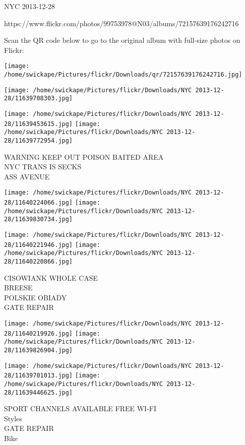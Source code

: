 \documentclass[10pt,letterpaper]{article}
\begin{document}
NYC 2013-12-28

https://www.flickr.com/photos/99753978@N03/albums/72157639176242716

Scan the QR code below to go to the original album with full-size photos on Flickr:

\texttt{[image: /home/swickape/Pictures/flickr/Downloads/qr/72157639176242716.jpg]}
\pagebreak

\texttt{[image: /home/swickape/Pictures/flickr/Downloads/NYC 2013-12-28/11639708303.jpg]}

\vspace{0.25in}
\texttt{[image: /home/swickape/Pictures/flickr/Downloads/NYC 2013-12-28/11639453615.jpg]}
\texttt{[image: /home/swickape/Pictures/flickr/Downloads/NYC 2013-12-28/11639772954.jpg]}

WARNING KEEP OUT POISON BAITED AREA\\
NYC TRANS IS SECKS\\
ASS AVENUE\\
\pagebreak

\texttt{[image: /home/swickape/Pictures/flickr/Downloads/NYC 2013-12-28/11640224066.jpg]}
\texttt{[image: /home/swickape/Pictures/flickr/Downloads/NYC 2013-12-28/11639830734.jpg]}

\texttt{[image: /home/swickape/Pictures/flickr/Downloads/NYC 2013-12-28/11640221946.jpg]}
\texttt{[image: /home/swickape/Pictures/flickr/Downloads/NYC 2013-12-28/11640220866.jpg]}

CISOWIANK WHOLE CASE\\
BREESE\\
POLSKIE OBIADY\\
GATE REPAIR\\
\pagebreak

\texttt{[image: /home/swickape/Pictures/flickr/Downloads/NYC 2013-12-28/11640219926.jpg]}
\texttt{[image: /home/swickape/Pictures/flickr/Downloads/NYC 2013-12-28/11639826904.jpg]}

\texttt{[image: /home/swickape/Pictures/flickr/Downloads/NYC 2013-12-28/11639701013.jpg]}
\texttt{[image: /home/swickape/Pictures/flickr/Downloads/NYC 2013-12-28/11639446625.jpg]}

SPORT CHANNELS AVAILABLE FREE WI{-}FI\\
Styles\\
GATE REPAIR\\
Bike\\
\pagebreak
\end{document}
